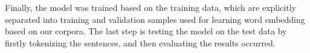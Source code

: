 Finally, the model was trained based on the training data, which are explicitly separated into training and validation samples used for learning word embedding based on our corpora. The last step is testing the model on the test data by firstly tokenizing the sentences, and then evaluating the results occurred.
